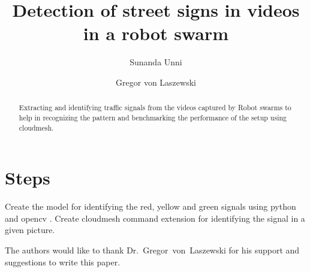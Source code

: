 
\title{Detection of street signs in videos in a robot swarm}


\author{Sunanda Unni}

\author{Gregor von Laszewski}


\renewcommand{\shortauthors}{G. v. Laszewski}


\begin{abstract}
  Extracting and identifying traffic signals from the videos captured
  by Robot swarms to help in recognizing the pattern and benchmarking
  the performance of the setup using cloudmesh.
\end{abstract}



\maketitle

\section{Steps}
Create the model for identifying the red, yellow and green signals
using python and opencv\cite{www-opencv} .  Create cloudmesh command
extension for identifying the signal in a given picture.


\begin{acks}

  The authors would like to thank Dr.~Gregor~von~Laszewski for his
  support and suggestions to write this paper.

\end{acks}


 

